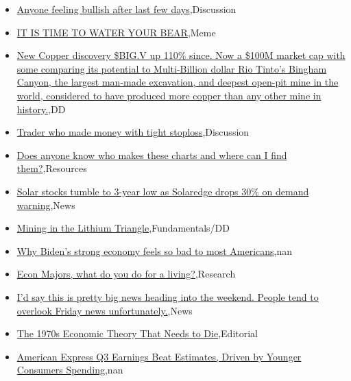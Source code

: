 \documentclass{article}%
\begin{document}
%
\begin{itemize}%
\item%
\href{https://reddit.com/r/wallstreetbets/comments/17cvrys/anyone\_feeling\_bullish\_after\_last\_few\_days/}{Anyone feeling bullish after last few days},Discussion%
\item%
\href{https://reddit.com/r/wallstreetbets/comments/17cv5dn/it\_is\_time\_to\_water\_your\_bear/}{IT IS TIME TO WATER YOUR BEAR},Meme%
\item%
\href{https://reddit.com/r/Baystreetbets/comments/17chbs6/new\_copper\_discovery\_bigv\_up\_110\_since\_now\_a\_100m/}{New Copper discovery \$BIG.V up 110\% since. Now a \$100M market cap with some comparing its potential to Multi-Billion dollar Rio Tinto's Bingham Canyon, the largest man-made excavation, and deepest open-pit mine in the world, considered to have produced more copper than any other mine in history.},DD%
\item%
\href{https://reddit.com/r/StockMarket/comments/17cfkes/trader\_who\_made\_money\_with\_tight\_stoploss/}{Trader who made money with tight stoploss},Discussion%
\item%
\href{https://reddit.com/r/StockMarket/comments/17cedob/does\_anyone\_know\_who\_makes\_these\_charts\_and\_where/}{Does anyone know who makes these charts and where can I find them?},Resources%
\item%
\href{https://reddit.com/r/StockMarket/comments/17cbx0n/solar\_stocks\_tumble\_to\_3year\_low\_as\_solaredge/}{Solar stocks tumble to 3-year low as Solaredge drops 30\% on demand warning},News%
\item%
\href{https://reddit.com/r/StockMarket/comments/17cber3/mining\_in\_the\_lithium\_triangle/}{Mining in the Lithium Triangle},Fundamentals/DD%
\item%
\href{https://reddit.com/r/Economics/comments/17cv1rz/why\_bidens\_strong\_economy\_feels\_so\_bad\_to\_most/}{Why Biden's strong economy feels so bad to most Americans},nan%
\item%
\href{https://reddit.com/r/Economics/comments/17cutpj/econ\_majors\_what\_do\_you\_do\_for\_a\_living/}{Econ Majors, what do you do for a living?},Research%
\item%
\href{https://reddit.com/r/Economics/comments/17cm3sf/id\_say\_this\_is\_pretty\_big\_news\_heading\_into\_the/}{I'd say this is pretty big news heading into the weekend. People tend to overlook Friday news unfortunately.},News%
\item%
\href{https://reddit.com/r/Economics/comments/17cemlp/the\_1970s\_economic\_theory\_that\_needs\_to\_die/}{The 1970s Economic Theory That Needs to Die},Editorial%
\item%
\href{https://reddit.com/r/Economics/comments/17cdg6i/american\_express\_q3\_earnings\_beat\_estimates/}{American Express Q3 Earnings Beat Estimates, Driven by Younger Consumers Spending},nan%
\end{itemize}%
\end{document}
